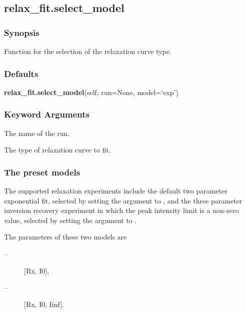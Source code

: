 \newpage

\subsection{relax\_fit.select\_model}


\subsubsection{Synopsis}

Function for the selection of the relaxation curve type.



\subsubsection{Defaults}

\textsf{\textbf{relax\_fit.select\_model}(self, run=None, model=`exp')}


\subsubsection{Keyword Arguments}

  The name of the run. 

  The type of relaxation curve to fit. 




\subsubsection{The preset models}

The supported relaxation experiments include the default two parameter exponential fit, selected by setting the  argument to , and the three parameter inversion recovery experiment in which the peak intensity limit is a non-zero value, selected by setting the argument to .


The parameters of these two models are


\begin{description}
\item[ --] [Rx, I0], 
\item[ --] [Rx, I0, Iinf]. 
\end{description}




\newpage

